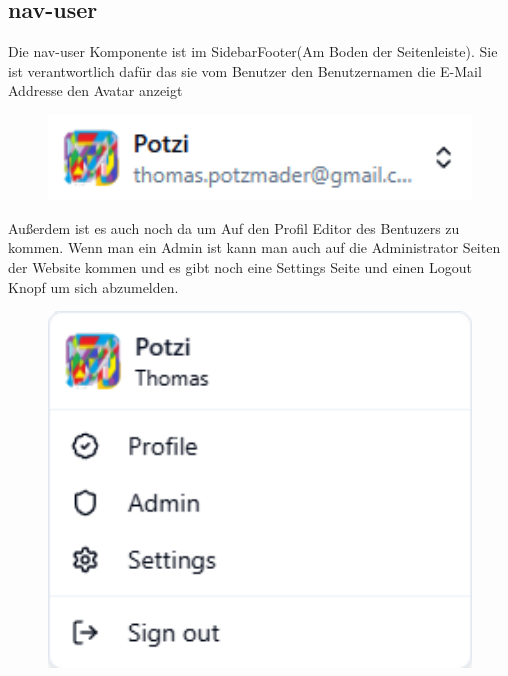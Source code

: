\begin{inhalt}

\subsection{nav-user}

Die nav-user Komponente ist im SidebarFooter(Am Boden der Seitenleiste). Sie ist verantwortlich dafür das sie vom Benutzer den Benutzernamen die E-Mail Addresse den Avatar anzeigt

\begin{figure}[!htb]
\centering
\includegraphics[width=1\textwidth]{files/Thomas/pics/Website/Sidebar/nav-user/user-component.png}
\caption[Bildbezeichnung für Abbildungsverzeichnis]{}
\label{fig:gehaeuse_internet_bild}
\end{figure}

\clearpage

Außerdem ist es auch noch da um Auf den Profil Editor des Bentuzers zu kommen. Wenn man ein Admin ist kann man auch auf die Administrator Seiten der Website kommen und es gibt noch eine Settings Seite und einen Logout Knopf um sich abzumelden. 

\begin{figure}[!htb]
\centering
\includegraphics[width=1\textwidth]{files/Thomas/pics/Website/Sidebar/nav-user/user-component-open.png}
\caption[Bildbezeichnung für Abbildungsverzeichnis]{}
\label{fig:gehaeuse_internet_bild}
\end{figure}


\end{inhalt}
